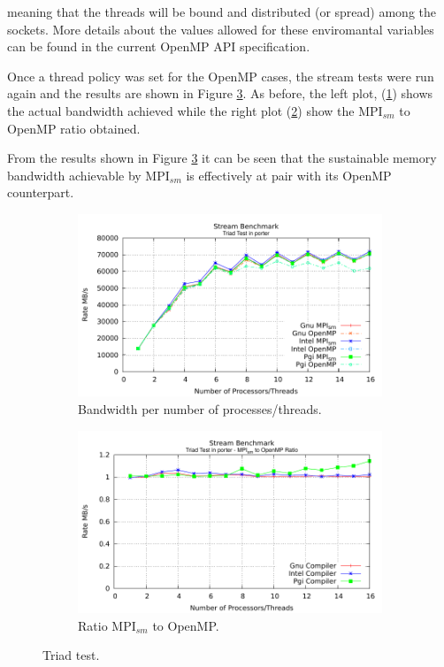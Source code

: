 meaning that the threads will be bound and distributed (or spread) among the sockets. More details about the values allowed for these enviromantal variables can be found in the current OpenMP API specification.

\medskip

Once a thread policy was set for the OpenMP cases, the stream tests were run again and the results are shown in Figure \ref{fig:TriadTest}. As before, the left plot, (\ref{fig:Triad}) shows the actual bandwidth achieved while the right plot (\ref{fig:TriadRatio}) show the MPI$_{sm}$ to OpenMP ratio obtained. 

\medskip
From the results shown in Figure \ref{fig:TriadTest} it can be seen that the sustainable memory bandwidth achievable by MPI$_{sm}$ is effectively at pair with its OpenMP counterpart.


\begin{figure} [h!]
    \centering
    \captionsetup{justification=centering, singlelinecheck=false}
    \begin{subfigure}{.6\textwidth}
      \hspace*{-1.5cm} 
      \includegraphics[width=0.95\linewidth]{Plots/streamBenchmark/porter-Triad.pdf}
      \caption[]{Bandwidth per number of processes/threads.}
      \label{fig:Triad}
    \end{subfigure}%
    \begin{subfigure}{.6\textwidth}
      \hspace*{-1.5cm} 
      \includegraphics[width=0.95\linewidth]{Plots/streamBenchmark/porter-TriadRatio.pdf}
      \caption{Ratio MPI$_{sm}$ to OpenMP.}
      \label{fig:TriadRatio}
    \end{subfigure}
\caption{Triad test.}
\label{fig:TriadTest}
\end{figure}


